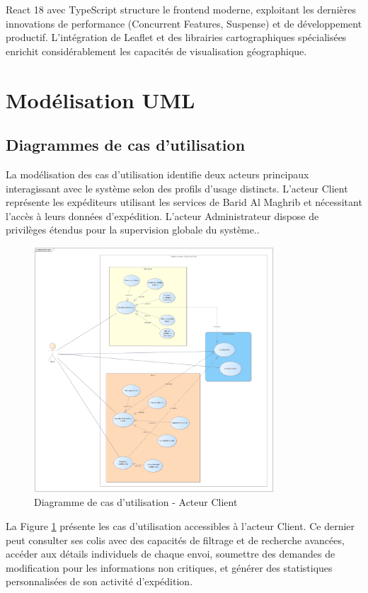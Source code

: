 React 18 avec TypeScript structure le frontend moderne, exploitant les dernières innovations de performance (Concurrent Features, Suspense) et de développement productif. L'intégration de Leaflet et des librairies cartographiques spécialisées enrichit considérablement les capacités de visualisation géographique.

\section{Modélisation UML}

\subsection{Diagrammes de cas d'utilisation}

La modélisation des cas d'utilisation identifie deux acteurs principaux interagissant avec le système selon des profils d'usage distincts. L'acteur Client représente les expéditeurs utilisant les services de Barid Al Maghrib et nécessitant l'accès à leurs données d'expédition. L'acteur Administrateur dispose de privilèges étendus pour la supervision globale du système..

\begin{figure}[H]
\centering
\includegraphics[width=0.8\textwidth]{images/Amana Colis Use Case Client.png}
\caption{Diagramme de cas d'utilisation - Acteur Client}
\label{fig:use_case_client}
\end{figure}

La Figure \ref{fig:use_case_client} présente les cas d'utilisation accessibles à l'acteur Client. Ce dernier peut consulter ses colis avec des capacités de filtrage et de recherche avancées, accéder aux détails individuels de chaque envoi, soumettre des demandes de modification pour les informations non critiques, et générer des statistiques personnalisées de son activité d'expédition.

